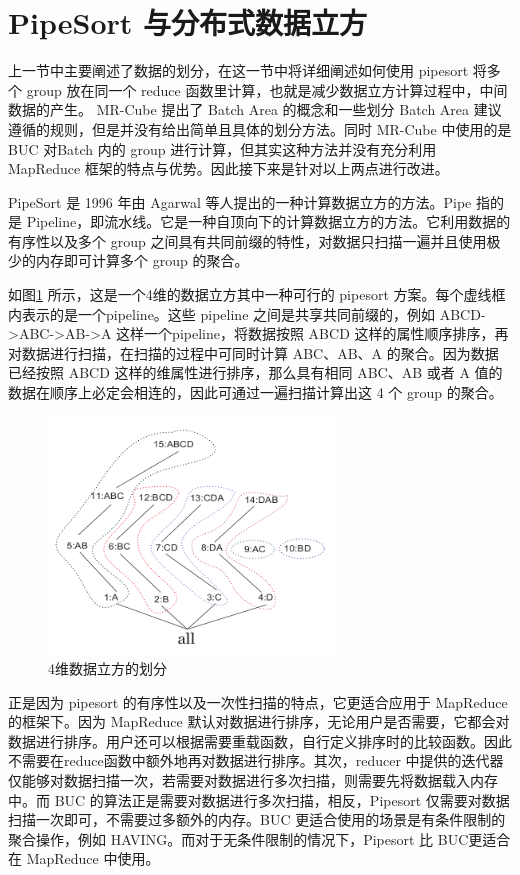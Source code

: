 \section{PipeSort 与分布式数据立方}

上一节中主要阐述了数据的划分，在这一节中将详细阐述如何使用 pipesort 将多个 group 放在同一个 reduce 函数里计算，也就是减少数据立方计算过程中，中间数据的产生。 MR-Cube 提出了 Batch Area 的概念和一些划分 Batch Area 建议遵循的规则，但是并没有给出简单且具体的划分方法。同时 MR-Cube 中使用的是 BUC 对Batch 内的 group 进行计算，但其实这种方法并没有充分利用 MapReduce 框架的特点与优势。因此接下来是针对以上两点进行改进。

PipeSort\cite{agarwal1996computation} 是 1996 年由 Agarwal 等人提出的一种计算数据立方的方法。Pipe 指的是 Pipeline，即流水线。它是一种自顶向下的计算数据立方的方法。它利用数据的有序性以及多个 group 之间具有共同前缀的特性，对数据只扫描一遍并且使用极少的内存即可计算多个 group 的聚合。

如图\ref{pipesort} 所示，这是一个4维的数据立方其中一种可行的 pipesort 方案。每个虚线框内表示的是一个pipeline。这些 pipeline 之间是共享共同前缀的，例如 ABCD-\textgreater ABC-\textgreater AB-\textgreater A 这样一个pipeline，将数据按照 ABCD 这样的属性顺序排序，再对数据进行扫描，在扫描的过程中可同时计算 ABC、AB、A 的聚合。因为数据已经按照 ABCD 这样的维属性进行排序，那么具有相同 ABC、AB 或者 A 值的数据在顺序上必定会相连的，因此可通过一遍扫描计算出这 4 个 group 的聚合。

\begin{figure}[!htb]
\centering\includegraphics[width=3in]{picture/ch_terasort_mr/pipesort} 
\caption{4维数据立方的划分}\label{pipesort} 
\end{figure} 

正是因为 pipesort 的有序性以及一次性扫描的特点，它更适合应用于 MapReduce 的框架下。因为 MapReduce 默认对数据进行排序，无论用户是否需要，它都会对数据进行排序。用户还可以根据需要重载函数，自行定义排序时的比较函数。因此不需要在reduce函数中额外地再对数据进行排序。其次，reducer 中提供的迭代器仅能够对数据扫描一次，若需要对数据进行多次扫描，则需要先将数据载入内存中。而 BUC 的算法正是需要对数据进行多次扫描，相反，Pipesort 仅需要对数据扫描一次即可，不需要过多额外的内存。BUC 更适合使用的场景是有条件限制的聚合操作，例如 HAVING。而对于无条件限制的情况下，Pipesort 比 BUC更适合在 MapReduce 中使用。

